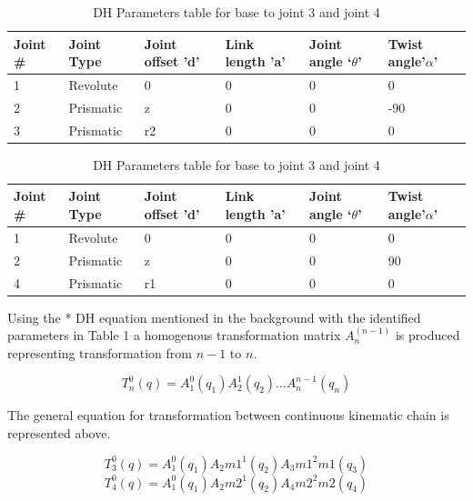 \documentclass{UoNMCHA}
\numberwithin{equation}{section}
\begin{document}
\begin{table}[] \centering 
	\caption{DH Parameters table for base to joint 3 and joint 4}
	\begin{tabular}{llllll}
		\hline
		Joint \# & Joint Type & Joint offset 'd' & Link length 'a' & Joint angle ‘$\theta$’ & Twist angle'$\alpha$' \\ \hline
		1        & Revolute   & 0                & 0               & 0               & 0              \\
		2        & Prismatic  & z                & 0               & 0              & -90            \\
		3        & Prismatic  & r2               & 0               & 0               & 0             
	\end{tabular} \vspace{5mm}

	\begin{tabular}{llllll}
	\hline
	Joint \# & Joint Type & Joint offset 'd' & Link length 'a' & Joint angle ‘$\theta$’ & Twist angle'$\alpha$' \\ \hline
	1        & Revolute   & 0                & 0               & 0               & 0              \\
	2        & Prismatic  & z                & 0               & 0              & 90            \\
	4        & Prismatic  & r1               & 0               & 0               & 0             
\end{tabular}

\end{table}


Using the * DH equation mentioned in the background with the identified parameters in Table 1 a homogenous transformation matrix $A_{n}^(n-1)$ is produced representing transformation from $n-1$ to $n$. 

\begin{equation}
	T_n^0 (q)=A_1^0 (q_1 ) A_2^1 (q_2 ) \dots A_{n}^{n-1} (q_n )
\end{equation}

The general equation for transformation between continuous kinematic chain is represented above.

\begin{equation}
	T_3^0 (q)=A_1^0 (q_1 ) A_2m1^1 (q_2 ) A_3m1^2m1 (q_3 )
\end{equation}
\begin{equation}
T_4^0 (q)=A_1^0 (q_1 ) A_2m2^1 (q_2 ) A_4m2^2m2 (q_4 )
\end{equation}
\end{document}
